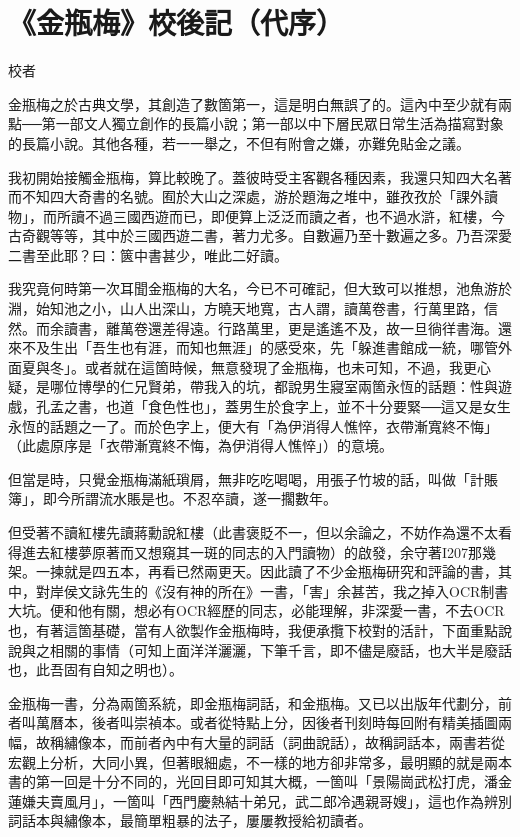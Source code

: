 \chapter*{《金瓶梅》校後記（代序）}

\begin{declareqianyan}
校者\qquad\ 
\end{declareqianyan}	

金瓶梅之於古典文學，其創造了數箇第一，這是明白無誤了的。這內中至少就有兩點──第一部文人獨立創作的長篇小說；第一部以中下層民眾日常生活為描寫對象的長篇小說。其他各種，若一一舉之，不但有附會之嫌，亦難免貼金之議。

我初開始接觸金瓶梅，算比較晚了。蓋彼時受主客觀各種因素，我還只知四大名著而不知四大奇書的名號。囿於大山之深處，游於題海之堆中，雖孜孜於「課外讀物」，而所讀不過三國西遊而已，即便算上泛泛而讀之者，也不過水滸，紅樓，今古奇觀等等，其中於三國西遊二書，著力尤多。自數遍乃至十數遍之多。乃吾深愛二書至此耶？曰：篋中書甚少，唯此二好讀。

我究竟何時第一次耳聞金瓶梅的大名，今已不可確記，但大致可以推想，池魚游於淵，始知池之小，山人出深山，方曉天地寬，古人謂，讀萬卷書，行萬里路，信然。而余讀書，離萬卷還差得遠。行路萬里，更是遙遙不及，故一旦徜徉書海。還來不及生出「吾生也有涯，而知也無涯」的感受來，先「躲進書館成一統，哪管外面夏與冬」。或者就在這箇時候，無意發現了金瓶梅，也未可知，不過，我更心疑，是哪位博學的仁兄賢弟，帶我入的坑，都說男生寢室兩箇永恆的話題：性與遊戲，孔孟之書，也道「食色性也」，蓋男生於食字上，並不十分要緊──這又是女生永恆的話題之一了。而於色字上，便大有「為伊消得人憔悴，衣帶漸寬終不悔」（此處原序是「衣帶漸寬終不悔，為伊消得人憔悴」）的意境。

但當是時，只覺金瓶梅滿紙瑣屑，無非吃吃喝喝，用張子竹坡的話，叫做「計賬簿」，即今所謂流水賬是也。不忍卒讀，遂一擱數年。

但受著不讀紅樓先讀蔣勳說紅樓（此書褒貶不一，但以余論之，不妨作為還不太看得進去紅樓夢原著而又想窺其一斑的同志的入門讀物）的啟發，余守著I207那幾架。一揀就是四五本，再看已然兩更天。因此讀了不少金瓶梅研究和評論的書，其中，對岸侯文詠先生的《沒有神的所在》一書，「害」余甚苦，我之掉入OCR制書大坑。便和他有關，想必有OCR經歷的同志，必能理解，非深愛一書，不去OCR也，有著這箇基礎，當有人欲製作金瓶梅時，我便承攬下校對的活計，下面重點說說與之相關的事情（可知上面洋洋灑灑，下筆千言，即不儘是廢話，也大半是廢話也，此吾固有自知之明也）。

金瓶梅一書，分為兩箇系統，即金瓶梅詞話，和金瓶梅。又已以出版年代劃分，前者叫萬曆本，後者叫崇禎本。或者從特點上分，因後者刊刻時每回附有精美插圖兩幅，故稱繡像本，而前者內中有大量的詞話（詞曲說話），故稱詞話本，兩書若從宏觀上分析，大同小異，但著眼細處，不一樣的地方卻非常多，最明顯的就是兩本書的第一回是十分不同的，光回目即可知其大概，一箇叫「景陽崗武松打虎，潘金蓮嫌夫賣風月」，一箇叫「西門慶熱結十弟兄，武二郎冷遇親哥嫂」，這也作為辨別詞話本與繡像本，最簡單粗暴的法子，屢屢教授給初讀者。

